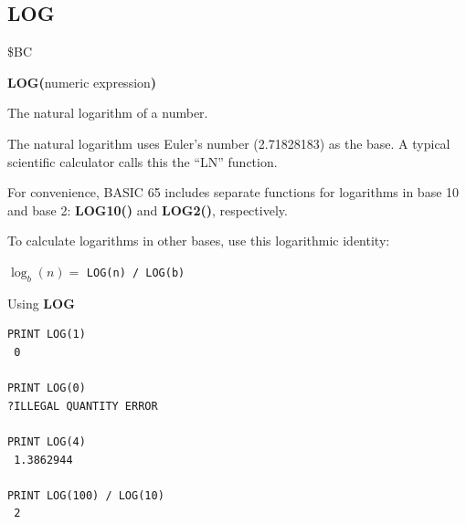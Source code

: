 \subsection{LOG}
\begin{description}[leftmargin=2cm,style=nextline]
\item [Token:]    \$BC

\item [Format:]   {\bf LOG(}numeric expression{\bf)}

\item [Returns:]  The natural logarithm of a number.

                  The natural logarithm uses Euler's number (2.71828183) as the base. A typical scientific calculator calls this the ``LN'' function.

\item [Remarks:]  For convenience, BASIC 65 includes separate functions for logarithms in base 10 and base 2: {\bf LOG10()} and {\bf LOG2()}, respectively.

                  To calculate logarithms in other bases, use this logarithmic identity:

                  $\log_b(n) =$ \texttt{LOG(n) / LOG(b)}

\item [Examples:] Using {\bf LOG}

\begin{tcolorbox}[colback=black,coltext=white]
\verbatimfont{\codefont}
\begin{verbatim}
PRINT LOG(1)
 0

PRINT LOG(0)
?ILLEGAL QUANTITY ERROR

PRINT LOG(4)
 1.3862944

PRINT LOG(100) / LOG(10)
 2
\end{verbatim}
\end{tcolorbox}
\end{description}


\newpage
